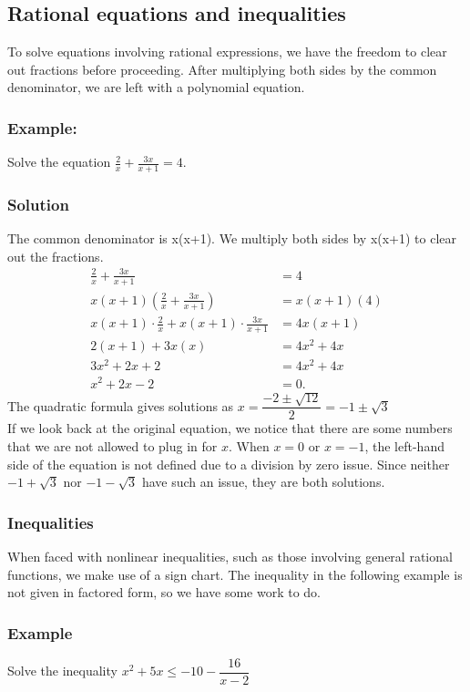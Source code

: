 \documentclass{article}
\begin{document}
\subsection{Rational equations and inequalities}
To solve equations involving rational expressions, we have the freedom to clear out fractions before proceeding. After multiplying both sides by the common denominator, we are left with a polynomial equation.

\subsubsection*{Example:}
Solve the equation $\frac {2}{x} + \frac {3x}{x+1} = 4.$
\subsubsection*{Solution }
The common denominator is x(x+1). We multiply both sides by x(x+1)
 to clear out the fractions.
\begin{align*} 
      \frac{2}{x} + \frac{3x}{x+1} &= 4  \\
      x(x+1) \left( \frac{2}{x} + \frac{3x}{x+1} \right) &= x(x+1) ( 4 )\\
      x(x+1) \cdot \frac{2}{x}  + x(x+1) \cdot \frac{3x}{x+1} &= 4x(x+1)\\
      2(x+1) + 3x(x) &= 4x^2 + 4x\\
      3x^2 + 2x + 2 &= 4x^2 + 4x\\
      x^2 + 2x - 2 &= 0.
    \end{align*}
The quadratic formula gives solutions as $\displaystyle x = \dfrac {-2 \pm \sqrt {12}}{2} = -1 \pm \sqrt {3}$\\

If we look back at the original equation, we notice that there are some numbers that we are not allowed to plug in for \(x\). When \(x=0\) or \(x=-1\), the left-hand side of the equation is not defined due to a division by zero issue. Since neither \(-1 + \sqrt{3}\) nor \(-1 - \sqrt{3}\) have such an issue, they are both solutions.
\subsubsection{Inequalities}
When faced with nonlinear inequalities, such as those involving general rational functions, we make use of a sign chart. The inequality in the following example is not given in factored form, so we have some work to do.

\subsubsection*{Example}
Solve the inequality $\displaystyle x^2 + 5x \leq -10 -\dfrac {16}{x-2}$
\newpage
\end{document}
